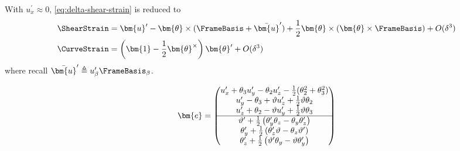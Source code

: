 With \(u_x^{\prime} \approx 0\), \eqref{eq:delta-shear-strain} is reduced to
\begin{equation}
\begin{aligned}
\ShearStrain &= \bm{u}^{\prime} - \bm{\theta}\times(\FrameBasis+\bar{\bm{u}}^{\prime})+\frac{1}{2}\bm{\theta}\times(\bm{\theta}\times\FrameBasis)  + O(\delta^3) \\
\CurveStrain &= 
\left(\bm{1} - \frac{1}{2}\bm{\theta}^\times\right)\bm{\theta}^{\prime}  + O(\delta^3)
\end{aligned}
\label{eq:stiff-shear-strain}
\end{equation}
where recall $\bar{\bm{u}}^{\prime} \triangleq u_{\beta}^{\prime}\FrameBasis_{\beta}$.

\begin{equation}
\bm{e} = \begin{pmatrix}
u_{x}^{\prime}+\theta_3 u_{y}^{\prime}-\theta_2 u_{z}^{\prime}-\frac{1}{2}(\theta_2^2+\theta_3^2) \\
u_{y}^{\prime}-\theta_3+\vartheta u_{z}^{\prime}+\frac{1}{2}\vartheta \theta_2 \\
u_{z}^{\prime}+\theta_2-\vartheta u_{y}^{\prime} + \frac{1}{2}\vartheta \theta_3 \\ \hline
\vartheta^{\prime}+\frac{1}{2}\left(\theta_{\FrameYi}^{\prime} \theta_z-\theta_{\FrameYi} \theta_z^{\prime}\right) \\
\theta_{\FrameYi}^{\prime}+\frac{1}{2}\left(\theta_z^{\prime} \vartheta-\theta_z \vartheta^{\prime}\right) \\
\theta_z^{\prime}+\frac{1}{2}\left(\vartheta^{\prime} \theta_{\FrameYi}-\vartheta \theta_{\FrameYi}^{\prime}\right)
\end{pmatrix}
\end{equation}

